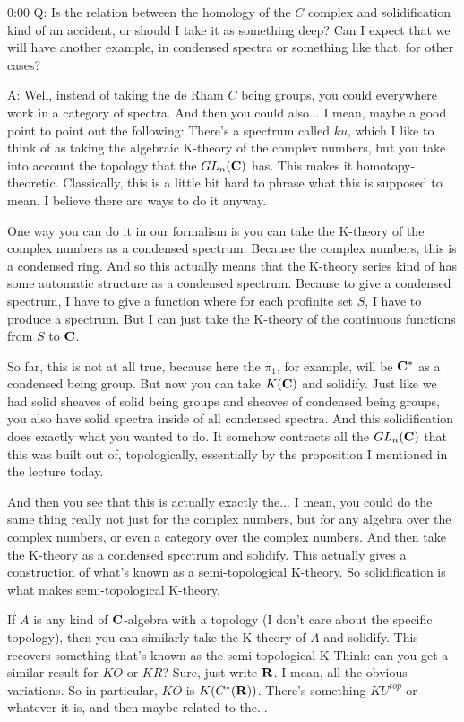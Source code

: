 \begin{unfinished}{0:00}
Q: Is the relation between the homology of the $C$ complex and solidification kind of an accident, or should I take it as something deep? Can I expect that we will have another example, in condensed spectra or something like that, for other cases?

A: Well, instead of taking the de Rham $C$ being groups, you could everywhere work in a category of spectra. And then you could also... I mean, maybe a good point to point out the following: There's a spectrum called $ku$, which I like to think of as taking the algebraic K-theory of the complex numbers, but you take into account the topology that the $GL_n(\mathbf C)$ has. This makes it homotopy-theoretic. Classically, this is a little bit hard to phrase what this is supposed to mean. I believe there are ways to do it anyway.

One way you can do it in our formalism is you can take the K-theory of the complex numbers as a condensed spectrum. Because the complex numbers, this is a condensed ring. And so this actually means that the K-theory series kind of has some automatic structure as a condensed spectrum. Because to give a condensed spectrum, I have to give a function where for each profinite set $S$, I have to produce a spectrum. But I can just take the K-theory of the continuous functions from $S$ to $\mathbf C$.

So far, this is not at all true, because here the $\pi_1$, for example, will be $\mathbf C^*$ as a condensed being group. But now you can take $K(\mathbf C)$ and solidify. Just like we had solid sheaves of solid being groups and sheaves of condensed being groups, you also have solid spectra inside of all condensed spectra. And this solidification does exactly what you wanted to do. It somehow contracts all the $GL_n(\mathbf C)$ that this was built out of, topologically, essentially by the proposition I mentioned in the lecture today.

And then you see that this is actually exactly the... I mean, you could do the same thing really not just for the complex numbers, but for any algebra over the complex numbers, or even a category over the complex numbers. And then take the K-theory as a condensed spectrum and solidify. This actually gives a construction of what's known as a semi-topological K-theory. So solidification is what makes semi-topological K-theory.

If $A$ is any kind of $\mathbf C$-algebra with a topology (I don't care about the specific topology), then you can similarly take the K-theory of $A$ and solidify. This recovers something that's known as the semi-topological K
Think: can you get a similar result for $KO$ or $KR$? Sure, just write $\mathbf R$. I mean, all the obvious variations. So in particular, $KO$ is $K(C^*(\mathbf R))$. There's something $KU^{top}$ or whatever it is, and then maybe related to the...


\end{unfinished}
